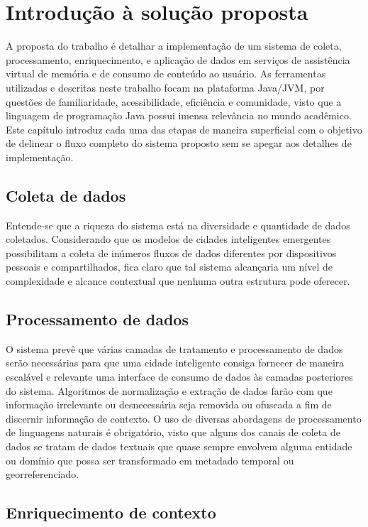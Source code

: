 \chapter{Introdução à solução proposta}

A proposta do trabalho é detalhar a implementação de um sistema de coleta, processamento, enriquecimento, e aplicação de dados em serviços de assistência virtual de memória e de consumo de conteúdo ao usuário. As ferramentas utilizadas e descritas neste trabalho focam na plataforma Java/JVM, por questões de familiaridade, acessibilidade, eficiência e comunidade, visto que a linguagem de programação Java possui imensa relevância no mundo acadêmico. Este capítulo introduz cada uma das etapas de maneira superficial com o objetivo de delinear o fluxo completo do sistema proposto sem se apegar aos detalhes de implementação.

\section{Coleta de dados}

Entende-se que a riqueza do sistema está na diversidade e quantidade de dados coletados. Considerando que os modelos de cidades inteligentes emergentes possibilitam a coleta de inúmeros fluxos de dados diferentes por dispositivos pessoais e compartilhados, fica claro que tal sistema alcançaria um nível de complexidade e alcance contextual que nenhuma outra estrutura pode oferecer. 

\section{Processamento de dados}

O sistema prevê que várias camadas de tratamento e processamento de dados serão necessárias para que uma cidade inteligente consiga fornecer de maneira escalável e relevante uma interface de consumo de dados às camadas posteriores do sistema. Algoritmos de normalização e extração de dados farão com que informação irrelevante ou desnecessária seja removida ou ofuscada a fim de discernir informação de contexto. O uso de diversas abordagens de processamento de linguagens naturais é obrigatório, visto que alguns dos canais de coleta de dados se tratam de dados textuais que quase sempre envolvem alguma entidade ou domínio que possa ser transformado em metadado temporal ou georreferenciado.

\section{Enriquecimento de contexto}

